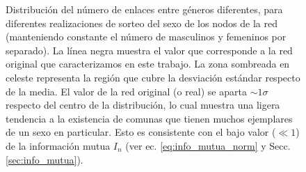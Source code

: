 \begin{figure}
    \centering
    \caption{
    Distribuci\'on del n\'umero de enlaces entre g\'eneros diferentes, para diferentes realizaciones de sorteo del sexo de los nodos de la red (manteniendo constante el n\'umero de masculinos y femeninos por separado).
    La l\'inea negra muestra el valor que corresponde a la red original que caracterizamos en este trabajo.
    La zona sombreada en celeste representa la regi\'on que cubre la desviaci\'on est\'andar respecto de la media.
    El valor de la red original (o real) se aparta $\sim 1 \sigma$ respecto del centro de la distribuci\'on, lo cual muestra una ligera tendencia a la existencia de comunas que tienen muchos ejemplares de un sexo en particular.
    Esto es consistente con el bajo valor ($\ll 1$) de la informaci\'on mutua $I_n$ (ver ec. \ref{eq:info_mutua_norm} y Secc. \ref{sec:info_mutua}).
    }
\label{fig:hist_sort_sex}
\end{figure}

